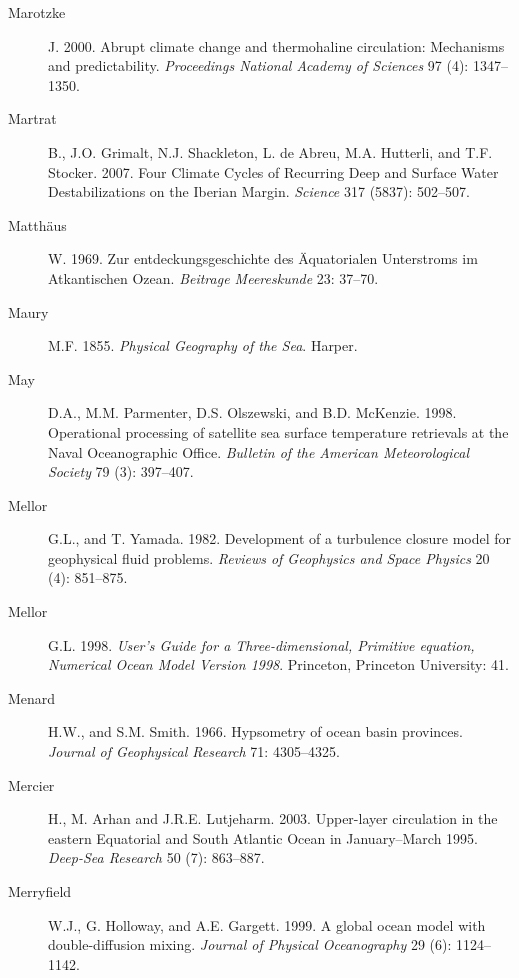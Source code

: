 \begin{description}
\item [Marotzke]J. 2000. Abrupt climate change and thermohaline
  circulation: Mechanisms and predictability. \textit{Proceedings
    National Academy of Sciences} 97 (4): 1347--1350.

\item [Martrat]B., J.O. Grimalt, N.J. Shackleton, L. de Abreu,
  M.A. Hutterli, and T.F. Stocker. 2007. Four Climate Cycles of
  Recurring Deep and Surface Water Destabilizations on the Iberian
  Margin. \textit{Science} 317 (5837): 502--507.

\item[Matth\"{a}us]W. 1969. Zur entdeckungsgeschichte des
  \"{A}quatorialen Unterstroms im Atkantischen Ozean. \textit{Beitrage
    Meereskunde} 23: 37--70.

\item [Maury]M.F. 1855. \textit{Physical Geography of the Sea}.
  Harper.

\item[May]D.A., M.M. Parmenter, D.S. Olszewski, and
  B.D. McKenzie. 1998.  Operational processing of satellite sea
  surface temperature retrievals at the Naval Oceanographic
  Office. \textit{Bulletin of the American Meteorological Society} 79
  (3): 397--407.

\item [Mellor]G.L., and T. Yamada. 1982. Development of a turbulence
  closure model for geophysical fluid problems. \textit{Reviews of
    Geophysics and Space Physics} 20 (4): 851--875.

\item [Mellor]G.L. 1998. \textit{User's Guide for a Three-dimensional,
  Primitive equation, Numerical Ocean Model Version 1998}. Princeton,
  Princeton University: 41.

\item [Menard]H.W., and S.M. Smith. 1966. Hypsometry of ocean basin
  provinces.  \textit{Journal of Geophysical Research} 71: 4305--4325.

\item [Mercier]H., M. Arhan and J.R.E. Lutjeharm. 2003. Upper-layer
  circulation in the eastern Equatorial and South Atlantic Ocean in
  January--March 1995. \textit{Deep-Sea Research} 50 (7): 863--887.

\item [Merryfield]W.J., G. Holloway, and A.E. Gargett.  1999. A global
  ocean model with double-diffusion mixing. \textit{Journal of
    Physical Oceanography} 29 (6): 1124--1142.


\end{description}
